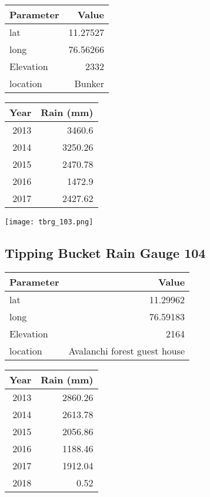 \documentclass[a4paper]{article}
\begin{document}
\begin{center}
\begin{tabular}{lr}
Parameter & Value\\
\hline
lat & 11.27527\\
long & 76.56266\\
Elevation & 2332\\
location & Bunker\\
\end{tabular}
\end{center}

\begin{center}
\begin{tabular}{rr}
Year & Rain (mm)\\
\hline
2013 & 3460.6\\
2014 & 3250.26\\
2015 & 2470.78\\
2016 & 1472.9\\
2017 & 2427.62\\
\end{tabular}
\end{center}

\begin{center}
\texttt{[image: tbrg\_103.png]}
\end{center}

\newpage

\subsection*{Tipping Bucket Rain Gauge 104}
\label{sec:org682161d}

\begin{center}
\begin{tabular}{lr}
Parameter & Value\\
\hline
lat & 11.29962\\
long & 76.59183\\
Elevation & 2164\\
location & Avalanchi forest guest house\\
\end{tabular}
\end{center}

\begin{center}
\begin{tabular}{rr}
Year & Rain (mm)\\
\hline
2013 & 2860.26\\
2014 & 2613.78\\
2015 & 2056.86\\
2016 & 1188.46\\
2017 & 1912.04\\
2018 & 0.52\\
\end{tabular}
\end{center}
\end{document}

